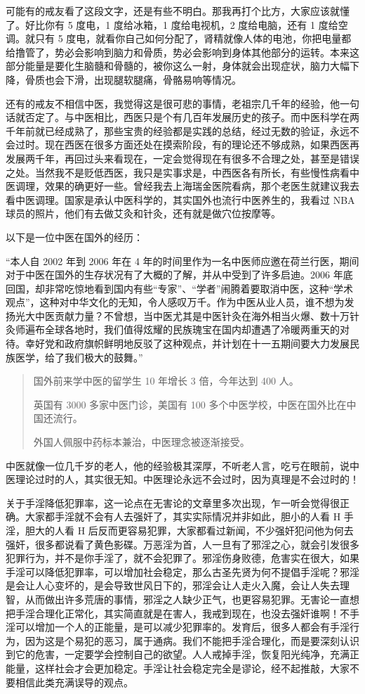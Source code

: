 可能有的戒友看了这段文字，还是有些不明白。那我再打个比方，大家应该就懂了。好比你有 5 度电，1 度给冰箱，1 度给电视机，2 度给电脑，还有 1 度给空调。就只有 5 度电，就看你自己如何分配了，肾精就像人体的电池，你把电量都给撸管了，势必会影响到脑力和骨质，势必会影响到身体其他部分的运转。本来这部分能量是要化生脑髓和骨髓的，被你这么一射，身体就会出现症状，脑力大幅下降，骨质也会下滑，出现腿软腿痛，骨骼易响等情况。

还有的戒友不相信中医，我觉得这是很可悲的事情，老祖宗几千年的经验，他一句话就否定了。与中医相比，西医只是个有几百年发展历史的孩子。而中医科学在两千年前就已经成熟了，那些宝贵的经验都是实践的总结，经过无数的验证，永远不会过时。现在西医在很多方面还处在摸索阶段，有的理论还不够成熟，如果西医再发展两千年，再回过头来看现在，一定会觉得现在有很多不合理之处，甚至是错误之处。当然我不是贬低西医，我只是实事求是，中西医各有所长，有些慢性病看中医调理，效果的确更好一些。曾经我去上海瑞金医院看病，那个老医生就建议我去看中医调理。国家是承认中医科学的，其实国外也流行中医养生的，我看过 NBA 球员的照片，他们有去做艾灸和针灸，还有就是做穴位按摩等。

以下是一位中医在国外的经历：

“本人自 2002 年到 2006 年在 4 年的时间里作为一名中医师应邀在荷兰行医，期间对于中医在国外的生存状况有了大概的了解，并从中受到了许多启迪。2006 年底回国，却非常吃惊地看到国内有些“专家”、“学者”闹腾着要取消中医，这种“学术观点”，这种对中华文化的无知，令人感叹万千。作为中医从业人员，谁不想为发扬光大中医贡献力量？不曾想，当中医尤其是中医针灸在海外相当火爆、数十万针灸师遍布全球各地时，我们值得炫耀的民族瑰宝在国内却遭遇了冷暖两重天的对待。幸好党和政府旗帜鲜明地反驳了这种观点，并计划在十一五期间要大力发展民族医学，给了我们极大的鼓舞。”

\begin{quotation}
    国外前来学中医的留学生 10 年增长 3 倍，今年达到 400 人。

    英国有 3000 多家中医门诊，美国有 100 多个中医学校，中医在国外比在中国还流行。

    外国人佩服中药标本兼治，中医理念被逐渐接受。
\end{quotation}

中医就像一位几千岁的老人，他的经验极其深厚，不听老人言，吃亏在眼前，说中医理论过时的人，其实很无知。中医理论永远不会过时，因为真理是不会过时的！

关于手淫降低犯罪率，这一论点在无害论的文章里多次出现，乍一听会觉得很正确。大家都手淫就不会有人去强奸了，其实实际情况并非如此，胆小的人看 H 手淫，胆大的人看 H 后反而更容易犯罪，大家都看过新闻，不少强奸犯问他为何去强奸，很多都说看了黄色影碟。万恶淫为首，人一旦有了邪淫之心，就会引发很多犯罪行为，并不是你手淫了，就不会犯罪了。邪淫伤身败德，危害实在很大，如果手淫可以降低犯罪率，可以增加社会稳定，那么古圣先贤为何不提倡手淫呢？邪淫是会让人心变坏的，是会导致世风日下的，邪淫会让人走火入魔，会让人失去理智，从而做出许多荒唐的事情，邪淫之人缺少正气，也更容易犯罪。无害论一直想把手淫合理化正常化，其实简直就是在害人，我戒到现在，也没去强奸谁啊！不手淫可以增加一个人的正能量，是可以减少犯罪率的。发育后，很多人都会有手淫行为，因为这是个易犯的恶习，属于通病。我们不能把手淫合理化，而是要深刻认识到它的危害，一定要学会控制自己的欲望。人人戒掉手淫，恢复阳光纯净，充满正能量，这样社会才会更加稳定。手淫让社会稳定完全是谬论，经不起推敲，大家不要相信此类充满误导的观点。

